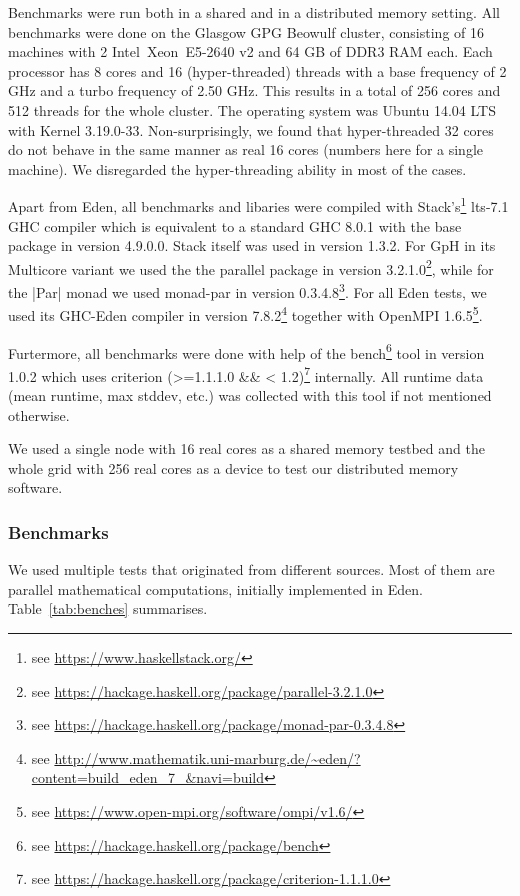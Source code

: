 Benchmarks were run both in a shared and in a distributed
memory setting. All benchmarks were done on the Glasgow GPG Beowulf cluster, consisting of
16 machines with 2 Intel\SymbReg~Xeon\SymbReg~E5-2640 v2 and 64 GB of DDR3 RAM each. Each processor has 8 cores and 16 (hyper-threaded) threads with a base frequency of 2 GHz and a turbo frequency of 2.50 GHz. This results in a total of 256 cores and 512 threads for the whole cluster. The operating system was Ubuntu 14.04 LTS with Kernel 3.19.0-33. Non-surprisingly, we found that hyper-threaded 32 cores do not behave in the same manner as real 16 cores (numbers here for a single machine). We disregarded the hyper-threading ability in most of the cases.

Apart from Eden, all benchmarks and libaries were compiled with Stack's\footnote{see \url{https://www.haskellstack.org/}} lts-7.1 GHC compiler which is equivalent to a standard GHC 8.0.1 with the base package in version 4.9.0.0. Stack itself was used in version 1.3.2. For GpH in its Multicore variant we used the the parallel package in version 3.2.1.0\footnote{see \url{https://hackage.haskell.org/package/parallel-3.2.1.0}}, while for the |Par| monad we used monad-par in version 0.3.4.8\footnote{see \url{https://hackage.haskell.org/package/monad-par-0.3.4.8}}. For all Eden tests, we used its GHC-Eden compiler in version 7.8.2\footnote{see \url{http://www.mathematik.uni-marburg.de/~eden/?content=build_eden_7_&navi=build}} together with OpenMPI 1.6.5\footnote{see \url{https://www.open-mpi.org/software/ompi/v1.6/}}.

Furtermore, all benchmarks were done with help of the bench\footnote{see \url{https://hackage.haskell.org/package/bench}} tool in version 1.0.2 which uses criterion (>=1.1.1.0 \&\& < 1.2)\footnote{see \url{https://hackage.haskell.org/package/criterion-1.1.1.0}} internally. All runtime data (mean runtime, max stddev, etc.) was collected with this tool if not mentioned otherwise.

We used a single node with 16 real cores as a shared memory testbed
and the whole grid with 256 real cores as a device to test our
distributed memory software.

\subsubsection{Benchmarks}

We used multiple tests that originated from different
sources. Most of them are parallel mathematical computations, initially
implemented in Eden. Table~\ref{tab:benches} summarises.

